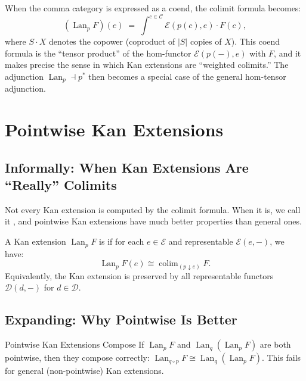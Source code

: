 When the comma category is expressed as a coend, the colimit formula becomes:
\begin{equation*}
  (\operatorname{Lan}_p F)(e)
  \;=\;
  \int^{c \in \mathcal{C}} \mathcal{E}(p(c), e) \cdot F(c),
\end{equation*}
where $S \cdot X$ denotes the copower (coproduct of $|S|$ copies of $X$). This
coend formula is the ``tensor product'' of the hom-functor $\mathcal{E}(p(-), e)$
with $F$, and it makes precise the sense in which Kan extensions are ``weighted
colimits.'' The adjunction $\operatorname{Lan}_p \dashv p^*$ then becomes a
special case of the general hom-tensor adjunction.


\section{Pointwise Kan Extensions}
\label{sec:pointwise-kan}

\subsection{Informally: When Kan Extensions Are ``Really'' Colimits}

Not every Kan extension is computed by the colimit formula. When it is, we call
it , and pointwise Kan extensions have much better properties
than general ones.

A Kan extension $\operatorname{Lan}_p F$ is  if for each
$e \in \mathcal{E}$ and representable $\mathcal{E}(e, -)$, we have:
\begin{equation*}
  \operatorname{Lan}_p F(e) \cong \operatorname{colim}_{(p \downarrow e)} F.
\end{equation*}
Equivalently, the Kan extension is preserved by all representable functors
$\mathcal{D}(d, -)$ for $d \in \mathcal{D}$.

\subsection{Expanding: Why Pointwise Is Better}

\begin{example}{Pointwise Kan Extensions Compose}
If $\operatorname{Lan}_p F$ and $\operatorname{Lan}_q (\operatorname{Lan}_p F)$
are both pointwise, then they compose correctly:
$\operatorname{Lan}_{q \circ p} F \cong \operatorname{Lan}_q (\operatorname{Lan}_p F)$.
This fails for general (non-pointwise) Kan extensions.
\end{example}

